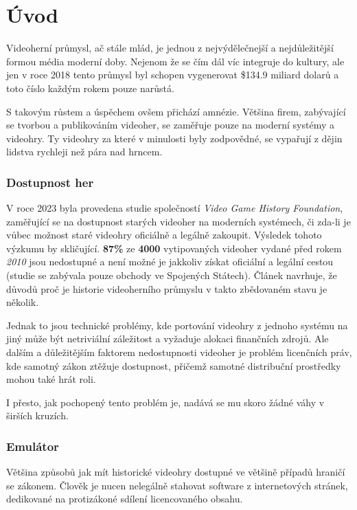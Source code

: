 \chapter{Úvod}
\label{introduction}

Videoherní průmysl, ač stále mlád, je jednou z nejvýdělečnejší a 
nejdůležitější formou média moderní doby. Nejenom že se čím dál víc
integruje do kultury, ale jen v roce 2018 tento průmysl byl
schopen vygenerovat \$134.9 miliard dolarů a
toto číslo každým rokem pouze narůstá.

S takovým růstem a úspěchem ovšem přichází amnézie. Většina firem,
zabývající se tvorbou a publikováním videoher, se zaměřuje pouze
na moderní systémy a videohry. Ty videohry za které v minulosti byly zodpovědné,
se vypařují z dějin lidstva rychleji než pára nad hrncem.

\subsection*{Dostupnost her}

V roce 2023 byla provedena studie společností \textit{Video Game History Foundation}, 
zaměřující se na dostupnost starých videoher na moderních systémech, 
či zda-li je vůbec možnost staré videohry oficiálně a legálně zakoupit.
Výsledek tohoto výzkumu by skličující. \textbf{87\%} ze \textbf{4000} vytipovaných videoher
vydané před rokem \textit{2010} jsou nedostupné a není možné je
jakkoliv získat oficiální a legální cestou (studie se zabývala pouze
obchody ve Spojených Státech). Článek navrhuje, že důvodů proč je historie
videoherního průmyslu v takto zbědovaném stavu je několik.

Jednak to jsou technické problémy, kde portování videohry z jednoho systému
na jiný může být netriviální záležitost a vyžaduje alokaci finančních zdrojů.
Ale dalším a důležitějším faktorem nedostupnosti videoher je problém licenčních práv,
kde samotný zákon ztěžuje dostupnost, přičemž samotné distribuční prostředky mohou
také hrát roli.

I přesto, jak pochopený tento problém je, nadává se mu skoro žádné váhy v
širších kruzích.

\subsection*{Emulátor}

Většina způsobů jak mít historické videohry dostupné ve většině případů hraničí
se zákonem. Člověk je nucen nelegálně stahovat software z internetových stránek,
dedikované na protizákoné sdílení licencovaného obsahu.

